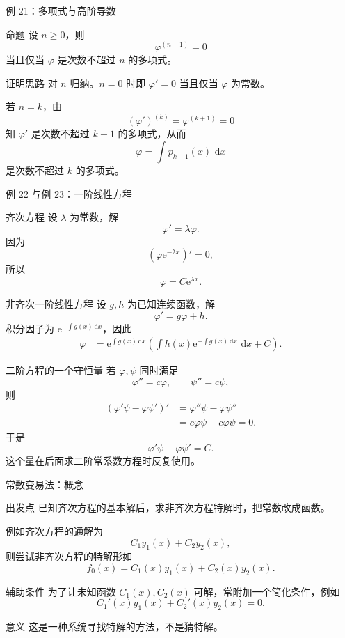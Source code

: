 \documentclass[aspectratio=169,10pt]{ctexbeamer}
\newcommand{\dd}{\,\mathrm{d}}
\newcommand{\ee}{\mathrm{e}}
\begin{document}
\begin{frame}[t]{例 21：多项式与高阶导数}
\small
\begin{block}{命题}
设 $n\ge0$，则
\[
  \varphi^{(n+1)}=0
\]
当且仅当 $\varphi$ 是次数不超过 $n$ 的多项式。
\end{block}

\begin{block}{证明思路}
对 $n$ 归纳。$n=0$ 时即 $\varphi'=0$ 当且仅当 $\varphi$ 为常数。

若 $n=k$，由
\[
  (\varphi')^{(k)}=\varphi^{(k+1)}=0
\]
知 $\varphi'$ 是次数不超过 $k-1$ 的多项式，从而
\[
  \varphi=\int p_{k-1}(x)\,\dd x
\]
是次数不超过 $k$ 的多项式。
\end{block}
\end{frame}

\begin{frame}[t,shrink=5]{例 22 与例 23：一阶线性方程}
\small
\begin{block}{齐次方程}
设 $\lambda$ 为常数，解
\[
  \varphi'=\lambda\varphi.
\]
因为
\[
  (\varphi\ee^{-\lambda x})'=0,
\]
所以
\[
  \boxed{\varphi=C\ee^{\lambda x}.}
\]
\end{block}

\begin{block}{非齐次一阶线性方程}
设 $g,h$ 为已知连续函数，解
\[
  \varphi'=g\varphi+h.
\]
积分因子为 $\ee^{-\int g(x)\dd x}$，因此
\[
\boxed{
\begin{aligned}
\varphi
&=\ee^{\int g(x)\dd x}
\left(\int h(x)\ee^{-\int g(x)\dd x}\,\dd x+C\right).
\end{aligned}}
\]
\end{block}
\end{frame}

\begin{frame}[t]{二阶方程的一个守恒量}
\small
若 $\varphi,\psi$ 同时满足
\[
  \varphi''=c\varphi,\qquad \psi''=c\psi,
\]
则
\[
\begin{aligned}
(\varphi'\psi-\varphi\psi')'
&=\varphi''\psi-\varphi\psi''\\
&=c\varphi\psi-c\varphi\psi=0.
\end{aligned}
\]
于是
\[
  \varphi'\psi-\varphi\psi'=C.
\]
这个量在后面求二阶常系数方程时反复使用。
\end{frame}

\begin{frame}[t]{常数变易法：概念}
\small
\begin{block}{出发点}
已知齐次方程的基本解后，求非齐次方程特解时，把常数改成函数。
\end{block}

例如齐次方程的通解为
\[
  C_1y_1(x)+C_2y_2(x),
\]
则尝试非齐次方程的特解形如
\[
  f_0(x)=C_1(x)y_1(x)+C_2(x)y_2(x).
\]

\begin{block}{辅助条件}
为了让未知函数 $C_1(x),C_2(x)$ 可解，常附加一个简化条件，例如
\[
  C_1'(x)y_1(x)+C_2'(x)y_2(x)=0.
\]
\end{block}

\begin{alertblock}{意义}
这是一种系统寻找特解的方法，不是猜特解。
\end{alertblock}
\end{frame}
\end{document}
